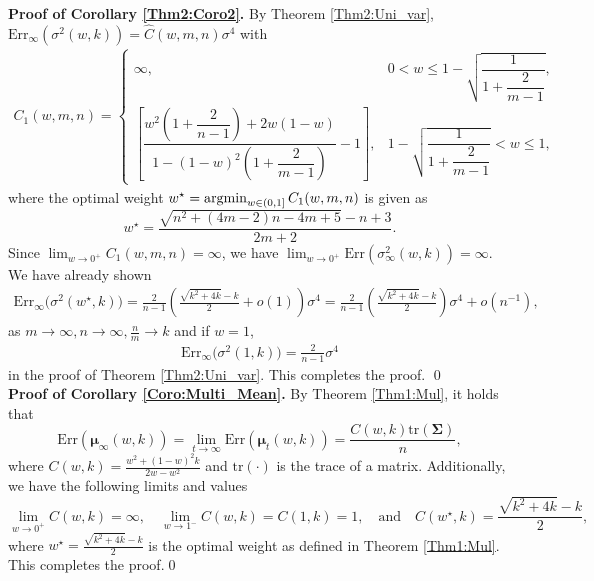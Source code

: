 \noindent
\textbf{Proof of Corollary \ref{Thm2:Coro2}.} By Theorem \ref{Thm2:Uni_var}, $\mathrm{Err}_{\infty}(\sigma^2(w,k)) = {\widehat{C}(w,m,n)\sigma^4}$ with 
\begin{align*}
C_1(w,m,n) = \begin{cases} 
\infty, & 0 < w \leq 1 - \sqrt{\dfrac{1}{1+\dfrac{2}{m-1}}}, \\[10pt]
\left[\dfrac{w^2\left(1 + \dfrac{2}{n-1}\right) + 2w(1-w)}{1 - (1-w)^2\left(1+\dfrac{2}{m-1}\right)} - 1 \right] , & 1 - \sqrt{\dfrac{1}{1+\dfrac{2}{m-1}}} < w \leq 1,
\end{cases}
\end{align*}
where the optimal weight $w^\star=\mathop{\mathrm{argmin}}_{w \in (0,1]}C_1(w, m, n)$ is given as
$$
w^\star = \frac{\sqrt{n^{2} + \left(4m - 2\right) n - 4m + 5} - n + 3}{2m + 2}.
$$
Since $\lim_{w \to 0^{+}}C_1(w,m,n)=\infty$, we have $\lim_{w \rightarrow 0^{+}} \mathrm{Err}(\sigma_{\infty}^2(w,k)) =\infty$. \\
We have already shown \begin{align*}
\mathrm{Err}_{\infty}\big(\sigma^2(w^{\star},k)\big)=\frac{2}{n-1}( \frac{\sqrt{k^2+4k}-k}{2}+o(1)  )\sigma^4=\frac{2}{n-1}\left( \frac{\sqrt{k^2+4k}-k}{2}  \right)\sigma^4+o(n^{-1}),
\end{align*}
as $m \xrightarrow{} \infty, n\xrightarrow{} \infty, \frac{n}{m}\xrightarrow{}k$ and if $w=1$,
\begin{align*}
\mathrm{Err}_{\infty}\big(\sigma^2(1,k)\big)=\frac{2}{n-1}\sigma^4
\end{align*}
in the proof of Theorem \ref{Thm2:Uni_var}. This completes the proof.
\qed \\

\noindent
\textbf{Proof of Corollary \ref{Coro:Multi_Mean}.} By Theorem \ref{Thm1:Mul}, it holds that 
$$\mathrm{Err}(\bm{\mu}_{\infty}(w,k)) = \lim_{t \rightarrow \infty} \mathrm{Err}(\bm{\mu}_{t}(w,k) ) 
=\frac{C(w,k)\mathrm{tr}(\bm{\Sigma})}{n},$$
where $C(w,k) =\frac{w^2+(1-w)^2k}{2w-w^2}$ and $\mathrm{tr}(\cdot)$ is the trace of a matrix. 
Additionally, we have the following limits and values
$$
\lim_{w \to 0^+} C(w,k) = \infty, \quad \lim_{w \to 1^-} C(w,k) = C(1,k) = 1, \quad \text{and} \quad C(w^{\star},k) = \frac{\sqrt{k^{2} + 4k} - k}{2},
$$
where $w^\star = \frac{\sqrt{k^{2} + 4k} - k}{2}$ is the optimal weight as defined in Theorem \ref{Thm1:Mul}. This completes the proof.\qed \\

